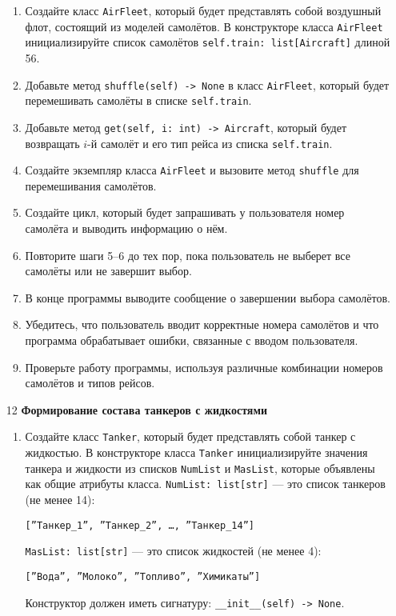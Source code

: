 \begin{enumerate}
\begin{enumerate}
    \item Создайте класс \texttt{AirFleet}, который будет представлять собой воздушный флот, состоящий из моделей самолётов. В конструкторе класса \texttt{AirFleet} инициализируйте список самолётов \texttt{self.train: list[Aircraft]} длиной 56.

    \item Добавьте метод \texttt{shuffle(self) -> None} в класс \texttt{AirFleet}, который будет перемешивать самолёты в списке \texttt{self.train}.

    \item Добавьте метод \texttt{get(self, i: int) -> Aircraft}, который будет возвращать $i$-й самолёт и его тип рейса из списка \texttt{self.train}.

    \item Создайте экземпляр класса \texttt{AirFleet} и вызовите метод \texttt{shuffle} для перемешивания самолётов.

    \item Создайте цикл, который будет запрашивать у пользователя номер самолёта и выводить информацию о нём.

    \item Повторите шаги 5–6 до тех пор, пока пользователь не выберет все самолёты или не завершит выбор.

    \item В конце программы выводите сообщение о завершении выбора самолётов.

    \item Убедитесь, что пользователь вводит корректные номера самолётов и что программа обрабатывает ошибки, связанные с вводом пользователя.

    \item Проверьте работу программы, используя различные комбинации номеров самолётов и типов рейсов.
\end{enumerate}

\item[12] \textbf{Формирование состава танкеров с жидкостями}
\begin{enumerate}
    \item Создайте класс \texttt{Tanker}, который будет представлять собой танкер с жидкостью. В конструкторе класса \texttt{Tanker} инициализируйте значения танкера и жидкости из списков \texttt{NumList} и \texttt{MasList}, которые объявлены как общие атрибуты класса. \texttt{NumList: list[str]} — это список танкеров (не менее 14): 
    \begin{center}
        \texttt{[''Танкер\_1'', ''Танкер\_2'', \dots, ''Танкер\_14'']}
    \end{center}
    \texttt{MasList: list[str]} — это список жидкостей (не менее 4):
    \begin{center}
        \texttt{[''Вода'', ''Молоко'', ''Топливо'', ''Химикаты'']}
    \end{center}
    Конструктор должен иметь сигнатуру: \texttt{\_\_init\_\_(self) -> None}.


\end{enumerate}
\end{enumerate}
